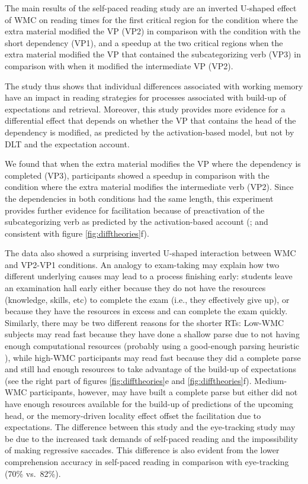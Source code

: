 \documentclass{frontiersSCNS}\usepackage{knitr}
\begin{document}
The main results of the self-paced reading study are an inverted U-shaped effect of WMC on reading times for the first critical region for the condition where the extra material modified the VP (VP2) in comparison with the condition with the short dependency (VP1), and a speedup at the two critical regions when the extra material modified the VP that contained the subcategorizing verb (VP3) in comparison with when it modified the intermediate VP (VP2).




The study thus shows that individual differences associated with working memory  have an impact in reading strategies for processes associated with build-up of expectations and retrieval.  Moreover, this study provides more evidence for a differential effect that depends on whether the VP that contains the head of the dependency is modified, as predicted by the activation-based model, but not by DLT and the expectation account.


We found that when the extra material modifies the VP where the dependency is completed (VP3), participants  showed a speedup in comparison with the condition where the extra material modifies the intermediate verb (VP2). Since the dependencies in both conditions had the same length, this experiment provides further evidence  for facilitation because of preactivation of the subcategorizing verb as predicted by the activation-based account (\citealp{VasishthLewis2006}; and consistent with figure \ref{fig:difftheories}f).

The data also showed  a surprising inverted U-shaped interaction between WMC  and VP2-VP1 conditions. 
An analogy to exam-taking may explain how two different underlying causes may lead to a process finishing early:
students leave an examination hall early either because they  do not have the resources (knowledge, skills, etc) to complete the exam (i.e., they effectively give up), or because they have the resources in excess and can complete the exam quickly. 
Similarly, 
there may be two different reasons for the shorter RTs: 
Low-WMC subjects may read fast because they  have done a shallow parse due to not having enough computational resources (probably using a good-enough parsing heuristic \citealp[see:][]{FerreiraEtAl2002,FerreiraPatson2007}), while high-WMC participants may read fast because they did a complete parse and still had enough resources to take advantage of the build-up of expectations (see the right part of figures \ref{fig:difftheories}e and \ref{fig:difftheories}f). Medium-WMC participants, however, may have built a complete parse but either did not have enough resources available for the build-up of predictions of the upcoming head, or the memory-driven locality effect offset the facilitation due to expectations. The difference between this study and the eye-tracking study may be due to the increased task demands of self-paced reading and the impossibility of making regressive saccades. This difference is also evident from the lower comprehension accuracy in  self-paced reading  in comparison with  eye-tracking  (70\% vs.\ 82\%).
\end{document}
